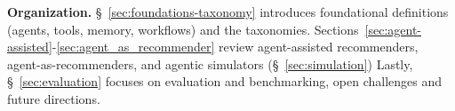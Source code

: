 \noindent\textbf{Organization.}
\S~\ref{sec:foundations-taxonomy} introduces foundational definitions (agents, tools, memory, workflows) and the taxonomies. 
Sections~\ref{sec:agent-assisted}-\ref{sec:agent_as_recommender} review agent-assisted recommenders, agent-as-recommenders, and agentic simulators (\S~\ref{sec:simulation})
Lastly, \S~\ref{sec:evaluation} focuses on evaluation and benchmarking, open challenges and future directions. 





